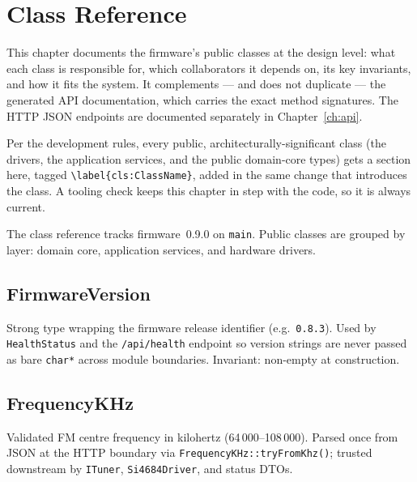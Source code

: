 \chapter{Class Reference}
\label{ch:classes}

This chapter documents the firmware's public classes at the design level:
what each class is responsible for, which collaborators it depends on, its
key invariants, and how it fits the system. It complements --- and does
not duplicate --- the generated API documentation, which carries the exact
method signatures. The HTTP JSON endpoints are documented separately in
Chapter~\ref{ch:api}.

\begin{drnote}
Per the development rules, every public, architecturally-significant class
(the drivers, the application services, and the public domain-core types)
gets a section here, tagged \texttt{\textbackslash label\{cls:ClassName\}},
added in the same change that introduces the class. A tooling check keeps
this chapter in step with the code, so it is always current.
\end{drnote}

The class reference tracks firmware~0.9.0 on \texttt{main}. Public classes
are grouped by layer: domain core, application services, and hardware drivers.


\section{FirmwareVersion}\label{cls:FirmwareVersion}
Strong type wrapping the firmware release identifier (e.g.\ \texttt{0.8.3}).
Used by \texttt{HealthStatus} and the \texttt{/api/health} endpoint so
version strings are never passed as bare \texttt{char*} across module
boundaries. Invariant: non-empty at construction.

\section{FrequencyKHz}\label{cls:FrequencyKHz}
Validated FM centre frequency in kilohertz (64\,000–108\,000). Parsed once
from JSON at the HTTP boundary via \texttt{FrequencyKHz::tryFromKhz()};
trusted downstream by \texttt{ITuner}, \texttt{Si4684Driver}, and status DTOs.

